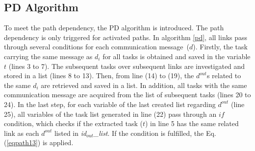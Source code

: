     \subsection{PD Algorithm}

    To meet the path dependency, the PD algorithm is introduced. The path dependency is only triggered for activated paths. In algorithm \ref{pd}, all links pass through several conditions for each communication message~($d$). Firstly, the task carrying the same message as $d_i$ for all tasks is obtained and saved in the variable $t$ (lines 3 to 7). The subsequent tasks over subsequent links are investigated and stored in a list (lines 8 to 13). Then, from line (14) to (19), the $d^{out}$s related to the same $d_i$ are retrieved and saved in a list. In addition, all tasks with the same communication message are acquired from the list of subsequent tasks (lines 20 to 24). In the last step, for each variable of the last created list regarding $d^{out}$ (line 25), all variables of the task list generated in line (22) pass through an $if$ condition, which checks if the extracted task ($t$) in line 5 has the same related link as each $d^{out}$ listed in \textit{id$_{out}$\_list}. If the condition is fulfilled, the Eq. (\ref{eqpath13}) is applied.

  
